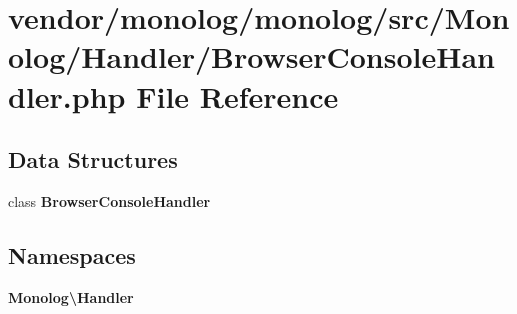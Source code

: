 \section{vendor/monolog/monolog/src/\+Monolog/\+Handler/\+Browser\+Console\+Handler.php File Reference}
\label{_browser_console_handler_8php}
\subsection*{Data Structures}
\begin{DoxyCompactItemize}
\item 
class {\bf Browser\+Console\+Handler}
\end{DoxyCompactItemize}
\subsection*{Namespaces}
\begin{DoxyCompactItemize}
\item 
 {\bf Monolog\textbackslash{}\+Handler}
\end{DoxyCompactItemize}
